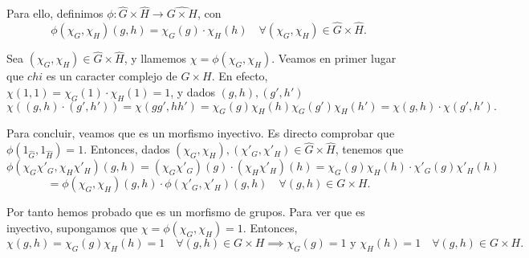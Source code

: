 Para ello, definimos \(\phi:\widehat{G} \times \widehat{H} \to \widehat{G \times H}\), con
\[
\phi(\chi_G, \chi_H)(g, h) = \chi_G(g) \cdot \chi_H(h) \quad \forall (\chi_G, \chi_H) \in \widehat{G} \times \widehat{H}
.\]

Sea \((\chi_G, \chi_H) \in \widehat{G} \times \widehat{H}\), y llamemos \(\chi = \phi(\chi_G, \chi_H)\). Veamos en primer lugar que \(chi\) es un caracter complejo de \(G \times H\). En efecto, \(\chi(1,1) = \chi_G(1) \cdot \chi_H(1) = 1\), y dados \((g,h), (g',h')\)
\[
\chi((g,h)\cdot(g',h')) = \chi(gg',hh') = \chi_G(g)\chi_H(h)\chi_G(g')\chi_H(h') = \chi(g,h)\cdot\chi(g',h')
.\]

Para concluir, veamos que es un morfismo inyectivo. Es directo comprobar que \(\phi(1_{\hat{G}},1_{\hat{H}}) = 1\). Entonces, dados \((\chi_G, \chi_H), (\chi'_G, \chi'_H) \in \widehat{G} \times \widehat{H}\), tenemos que
\[
\phi( \chi_G\chi'_G, \chi_H\chi'_H  )(g,h) = (\chi_G\chi'_G)(g) \cdot (\chi_H\chi'_H)(h) = \chi_G(g)\chi_H(h) \cdot \chi'_G(g)\chi'_H(h)
\]
\[
= \phi(\chi_G,\chi_H)(g,h) \cdot \phi(\chi'_G,\chi'_H)(g,h) \quad \forall (g,h) \in G \times H
.\]

Por tanto hemos probado que es un morfismo de grupos. Para ver que es inyectivo, supongamos que \( \chi = \phi(\chi_G, \chi_H) = 1\). Entonces,
\[
\chi(g,h) = \chi_G(g) \chi_H(h) = 1 \quad \forall (g,h) \in G \times H \implies \chi_G(g) = 1 \text{ y } \chi_H(h) = 1 \quad \forall (g,h) \in G \times H
.\]
